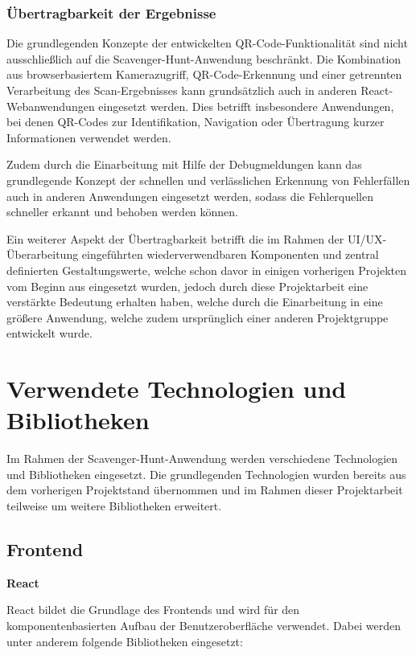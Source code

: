 ﻿\documentclass[oneside]{ausarbeitung}
\begin{document}
\subsection{Übertragbarkeit der Ergebnisse}
\label{sub:uebertragbarkeit}

Die grundlegenden Konzepte der entwickelten QR-Code-Funktionalität sind nicht ausschließlich auf die Scavenger-Hunt-Anwendung beschränkt. Die Kombination
aus browserbasiertem Kamerazugriff, QR-Code-Erkennung und einer getrennten Verarbeitung des Scan-Ergebnisses kann grundsätzlich auch in anderen 
React-Webanwendungen eingesetzt werden. Dies betrifft insbesondere Anwendungen, bei denen QR-Codes zur Identifikation, Navigation oder Übertragung
kurzer Informationen verwendet werden. 

Zudem durch die Einarbeitung mit Hilfe der Debugmeldungen kann das grundlegende Konzept der schnellen und verlässlichen Erkennung von Fehlerfällen
auch in anderen Anwendungen eingesetzt werden, sodass die Fehlerquellen schneller erkannt und behoben werden können.

Ein weiterer Aspekt der Übertragbarkeit betrifft die im Rahmen der UI/UX-Überarbeitung eingeführten wiederverwendbaren Komponenten und zentral 
definierten Gestaltungswerte, welche schon davor in einigen vorherigen Projekten vom Beginn aus eingesetzt wurden, jedoch durch diese Projektarbeit 
eine verstärkte Bedeutung erhalten haben, welche durch die Einarbeitung in eine größere Anwendung, welche zudem ursprünglich einer anderen Projektgruppe
entwickelt wurde. 


\chapter{Verwendete Technologien und Bibliotheken}
\label{cha:technologien-bibliotheken}

Im Rahmen der Scavenger-Hunt-Anwendung werden verschiedene Technologien und Bibliotheken eingesetzt. Die grundlegenden Technologien wurden bereits aus dem
vorherigen Projektstand übernommen und im Rahmen dieser Projektarbeit teilweise um weitere Bibliotheken erweitert.

\section{Frontend}

\textbf{React}

React bildet die Grundlage des Frontends und wird für den komponentenbasierten Aufbau der Benutzeroberfläche verwendet.
Dabei werden unter anderem folgende Bibliotheken eingesetzt:
\end{document}
